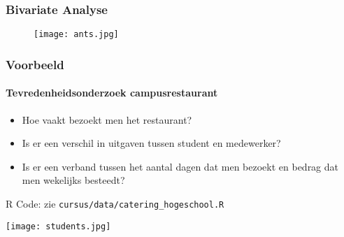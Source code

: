 \documentclass[aspectratio=169]{beamer}
\begin{document}
\begin{frame}
  \frametitle{Bivariate Analyse}
  \begin{figure}
    \centering
    \texttt{[image: ants.jpg]}
    \label{fig:ants}
  \end{figure}
  
\end{frame}

\begin{frame}
  \frametitle{Voorbeeld}
  \framesubtitle{Tevredenheidsonderzoek campusrestaurant}
  
  \begin{itemize}
    \item Hoe vaakt bezoekt men het restaurant?
    \item Is er een verschil in uitgaven tussen student en medewerker?
    \item Is er een verband tussen het aantal dagen dat men bezoekt en bedrag dat men wekelijks besteedt?
  \end{itemize}
  
  R Code: zie \texttt{cursus/data/catering\_hogeschool.R}
  
  \centering
  \texttt{[image: students.jpg]}
\end{frame}
\end{document}
